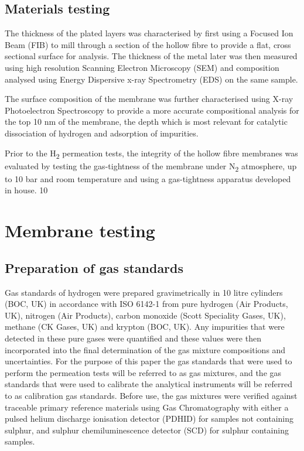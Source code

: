 \subsection{Materials testing}\label{MatTest}
The thickness of the plated layers was characterised by first using a Focused Ion Beam (FIB) to mill through a section of the hollow fibre to provide a flat, cross sectional surface for analysis. The thickness of the metal later was then measured using high resolution Scanning Electron Microscopy (SEM) and composition analysed using Energy Dispersive x-ray Spectrometry (EDS) on the same sample. 

The surface composition of the membrane was further characterised using X-ray Photoelectron Spectroscopy to provide a more accurate compositional analysis for the top 10 nm of the membrane, the depth which is most relevant for catalytic dissociation of hydrogen and adsorption of impurities.

Prior to the H\textsubscript{2} permeation tests, the integrity of the hollow fibre membranes was evaluated by testing the gas-tightness of the membrane under N\textsubscript{2} atmosphere, up to 10 bar and room temperature and using a gas-tightness apparatus developed in house. 10

\section{Membrane testing}
\subsection{Preparation of gas standards}
Gas standards of hydrogen were prepared gravimetrically in 10 litre cylinders (BOC, UK) in accordance with ISO 6142-1 from pure hydrogen (Air Products, UK), nitrogen (Air Products), carbon monoxide (Scott Speciality Gases, UK), methane (CK Gases, UK) and krypton (BOC, UK). Any impurities that were detected in these pure gases were quantified and these values were then incorporated into the final determination of the gas mixture compositions and uncertainties. For the purpose of this paper the gas standards that were used to perform the permeation tests will be referred to as gas mixtures, and the gas standards that were used to calibrate the analytical instruments will be referred to as calibration gas standards. Before use, the gas mixtures were verified against traceable primary reference materials using Gas Chromatography with either a pulsed helium discharge ionisation detector (PDHID) for samples not containing sulphur, and sulphur chemiluminescence detector (SCD) for sulphur containing samples.

